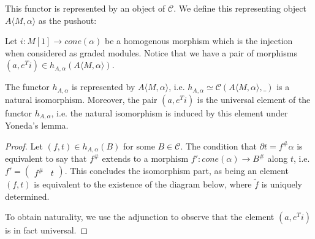 \documentclass[../thesis.tex]{subfiles}
\begin{document}
            This functor is represented by an object of $\mathcal{C}$. We define this representing object $A\langle M, \alpha\rangle$ as the pushout:
            \begin{center}
            \end{center}
            Let $i: M[1] \rightarrow cone(\alpha)$ be a homogenous morphism which is the injection when considered as graded modules. Notice that we have a pair of morphisms $(a, e^Ti)\in h_{A,\alpha}(A\langle M,\alpha\rangle)$.
                
            \begin{proposition}
                The functor $h_{A,\alpha}$ is represented by $A\langle M,\alpha\rangle$, i.e. $h_{A,\alpha}\simeq \mathcal{C}(A\langle M,\alpha\rangle,\_)$ is a natural isomorphism. Moreover, the pair $(a,e^Ti)$ is the universal element of the functor $h_{A,\alpha}$, i.e. the natural isomorphism is induced by this element under Yoneda's lemma.
            \end{proposition}

            \begin{proof}
                Let $(f,t)\in h_{A,\alpha}(B)$ for some $B\in\mathcal{C}$. The condition that $\partial t = f^\#\alpha$ is equivalent to say that $f^\#$ extends to a morphism $f' : cone(\alpha) \rightarrow B^\#$ along $t$, i.e. $f' = \begin{pmatrix}f^\# & t\end{pmatrix}$. This concludes the isomorphism part, as being an element $(f,t)$ is equivalent to the existence of the diagram below, where $\widetilde{f}$ is uniquely determined.
                \begin{center}
                \end{center}
  
                To obtain naturality, we use the adjunction to observe that the element $(a, e^Ti)$ is in fact universal.
            \end{proof}
\end{document}
